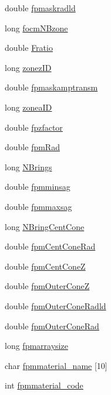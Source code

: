 \begin{DoxyCompactItemize}
double \hyperlink{structOPTPIAACMCDESIGN_ad6c571d51ab93c62406a1485713652c1}{fpmaskradld}
\item 
long \hyperlink{structOPTPIAACMCDESIGN_af885127a147736127de2d00f0872f7d3}{focm\+N\+Bzone}
\item 
double \hyperlink{structOPTPIAACMCDESIGN_a8395925e8cc76395b3f4efa8132c290c}{Fratio}
\item 
long \hyperlink{structOPTPIAACMCDESIGN_a46c2ef78ec06d39b947a793d0a03dc28}{zonez\+I\+D}
\item 
double \hyperlink{structOPTPIAACMCDESIGN_a263a0425fe40eda25832b7490b8b0391}{fpmaskamptransm}
\item 
long \hyperlink{structOPTPIAACMCDESIGN_afdfb76344ee9a82f3a5790fcb602ade6}{zonea\+I\+D}
\item 
double \hyperlink{structOPTPIAACMCDESIGN_a96c58c0598cb36779f027aaadb62073d}{fpzfactor}
\item 
double \hyperlink{structOPTPIAACMCDESIGN_aa1794c4a0929583574e315a064a1c538}{fpm\+Rad}
\item 
long \hyperlink{structOPTPIAACMCDESIGN_ac59ca64b62c48d2b6717d31114dcbf71}{N\+Brings}
\item 
double \hyperlink{structOPTPIAACMCDESIGN_abd8c35ecd940017543133dd855b1ffe3}{fpmminsag}
\item 
double \hyperlink{structOPTPIAACMCDESIGN_a5fd5d4ca057083ad662b5abac47d5140}{fpmmaxsag}
\item 
long \hyperlink{structOPTPIAACMCDESIGN_a501fee866e60cc90794c6d4fcfd3bc3a}{N\+Bring\+Cent\+Cone}
\item 
double \hyperlink{structOPTPIAACMCDESIGN_a493c4bf7d5a9348fb6331bb2f41adacb}{fpm\+Cent\+Cone\+Rad}
\item 
double \hyperlink{structOPTPIAACMCDESIGN_afc48f92c305dcd5b0ed1b3571eae68c8}{fpm\+Cent\+Cone\+Z}
\item 
double \hyperlink{structOPTPIAACMCDESIGN_a4951d69d7b5188a02510b3815812906e}{fpm\+Outer\+Cone\+Z}
\item 
double \hyperlink{structOPTPIAACMCDESIGN_a0feae8a5f179899a7cbd57e49e1c52df}{fpm\+Outer\+Cone\+Radld}
\item 
double \hyperlink{structOPTPIAACMCDESIGN_a640ea4b5690796066d3fc69aae0b157b}{fpm\+Outer\+Cone\+Rad}
\item 
long \hyperlink{structOPTPIAACMCDESIGN_a02a2edaa7c78edec5ec36133783318a9}{fpmarraysize}
\item 
char \hyperlink{structOPTPIAACMCDESIGN_a229a4f5b2b0f11256ad6447aa7240c4a}{fpmmaterial\+\_\+name} \mbox{[}10\mbox{]}
\item 
int \hyperlink{structOPTPIAACMCDESIGN_a109986baab6ae4c894500a5f2e350677}{fpmmaterial\+\_\+code}
\end{DoxyCompactItemize}


